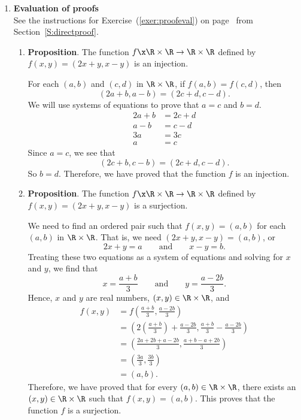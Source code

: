 \begin{enumerate}
\item \textbf{Evaluation of proofs}  \hfill \\
See the instructions for Exercise~(\ref{exer:proofeval}) on 
page~\pageref{exer:proofeval} from Section~\ref{S:directproof}.

\begin{enumerate}
\item \textbf{Proposition}. The function $f\x\R \times \R \to \R \times \R$ defined by  
$f( {x, y} ) = ( {2x + y, x - y} )$ is an injection. 
\
\begin{myproof}
For each $(a, b)$ and $(c, d)$ in $\R \times \R$, if $f(a, b) = f(c, d)$, then
\[
(2a + b, a - b) = (2c + d, c - d).
\]
We will use systems of equations to prove that $a = c$ and $b = d$.
\begin{align*}
2a + b &= 2c + d \\
 a - b &=  c - d \\
   3a  &= 3c \\
    a  &= c
\end{align*}
Since $a = c$, we see that
\[
(2c + b, c - b) = (2c + d, c - d).
\]
So $b = d$.  Therefore, we have proved that the function $f$ is an injection.
\end{myproof}


\item \textbf{Proposition}. The function $f\x\R \times \R \to \R \times \R$ defined by  
$f( {x, y} ) = ( {2x + y, x - y} )$ is a surjection. 

\begin{myproof}
We need to find an ordered pair such that $f(x, y) = (a, b)$ for each $(a, b)$ in 
$\R \times \R$.  That is, we need
$(2x + y, x - y) = (a, b)$, or
\[
2x + y = a \qquad \text{and} \qquad x - y = b.
\]
Treating these two equations as a system of equations and solving for $x$ and $y$, we find that
\[
x = \frac{a + b}{3} \qquad \text{and} \qquad y = \frac{a - 2b}{3}.
\]
Hence, $x$ and $y$ are real numbers, $(x, y) \in \R \times \R$, and
\begin{align*}
f(x, y) &= f \left( \frac{a + b}{3}, \frac{a - 2b}{3} \right) \\
        &= \left(2 \left( \frac{a + b}{3} \right) + \frac{a - 2b}{3}, \frac{a + b}{3} - \frac{a - 2b}{3} \right) \\
        &= \left( \frac{2a + 2b + a - 2b}{3}, \frac{a + b - a + 2b}{3} \right) \\
        &= \left( \frac{3a}{3}, \frac{3b}{3} \right) \\
        &= (a, b).
\end{align*}
Therefore, we have proved that for every $(a, b) \in \R \times \R$, there exists an 
$(x, y) \in \R \times \R$ such that $f(x, y) = (a, b)$.  This proves that the function $f$ is a surjection.
\end{myproof}
\end{enumerate}
\end{enumerate}


